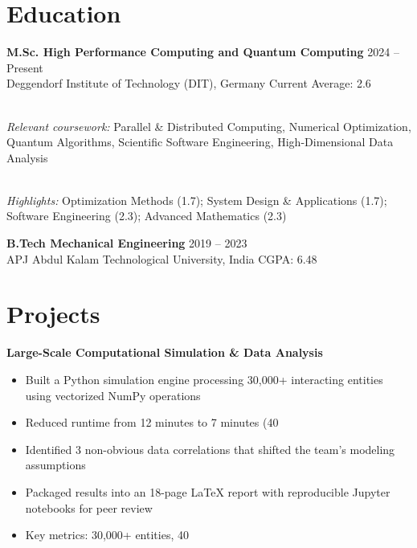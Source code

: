 \documentclass[11pt,a4paper]{article}
\begin{document}
\section{Education}

\textbf{ M.Sc. High Performance Computing and Quantum Computing } \hfill 2024 – Present\\
Deggendorf Institute of Technology (DIT), Germany \hfill Current Average: 2.6

\\\textit{Relevant coursework:} Parallel & Distributed Computing, Numerical Optimization, Quantum Algorithms, Scientific Software Engineering, High-Dimensional Data Analysis


\\\textit{Highlights:} Optimization Methods (1.7); System Design & Applications (1.7); Software Engineering (2.3); Advanced Mathematics (2.3)


\textbf{ B.Tech Mechanical Engineering } \hfill 2019 – 2023\\
APJ Abdul Kalam Technological University, India \hfill CGPA: 6.48




\section{Projects}

\textbf{ Large-Scale Computational Simulation & Data Analysis }
\begin{itemize}[leftmargin=*,nosep,topsep=2pt]
    
    \item Built a Python simulation engine processing 30,000+ interacting entities using vectorized NumPy operations
    
    \item Reduced runtime from 12 minutes to 7 minutes (40%
    
    \item Identified 3 non-obvious data correlations that shifted the team's modeling assumptions
    
    \item Packaged results into an 18-page LaTeX report with reproducible Jupyter notebooks for peer review
    
    \item Key metrics: 30,000+ entities, 40%
    
\end{itemize}
\end{document}
